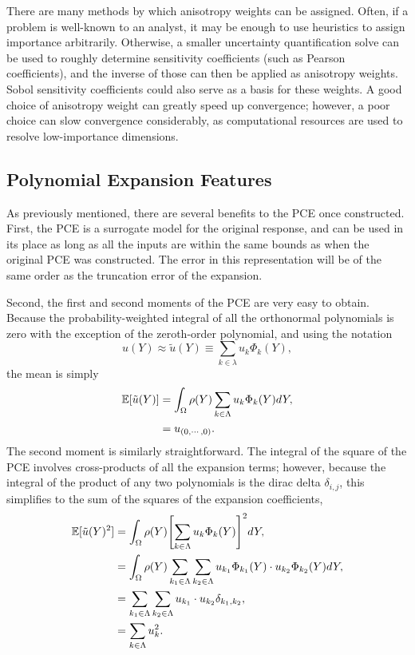 There are many methods by which anisotropy weights can be assigned.  Often, if a problem is well-known to an 
analyst, it may be enough to use heuristics to assign importance arbitrarily.  Otherwise, a smaller
uncertainty quantification solve can be used to roughly determine sensitivity coefficients (such as Pearson
coefficients), and the inverse of those can then be applied as anisotropy weights.  Sobol sensitivity coefficients
 could also serve as a basis for these weights.
A good choice of anisotropy weight can greatly speed up convergence; however, a
poor choice can slow convergence considerably, as computational resources are used to resolve low-importance
dimensions.


\subsection{Polynomial Expansion Features}
As previously mentioned, there are several benefits to the PCE once constructed.  First, the PCE is a
surrogate model for the original response, and can be used in its place as long as all the inputs are within
the same bounds as when the original PCE was constructed.  The error in this representation will be of the
same order as the truncation error of the expansion.

Second, the first and second moments of the PCE are very easy to obtain.  Because the probability-weighted 
integral of all the orthonormal polynomials is zero with the exception of the zeroth-order polynomial, and
using the notation 
\begin{equation}
  u(Y) \approx \tilde u(Y) \equiv \sum_{k\in\lambda} u_k\Phi_k(Y),
\end{equation}
the mean is simply
\begin{align}
  \mathbb{E}[ \tilde u(Y)]  &= \int_\Omega \rho(Y) \sum_{k\in\Lambda} u_k\Phi_k(Y) dY, \nonumber\\
                      &= u_{(0,\cdots,0)}.
\end{align}
The second moment is similarly straightforward.  The integral of the square of the PCE involves cross-products of
all the expansion terms; however, because the integral of the product of any two polynomials is the dirac
delta $\delta_{i,j}$, this simplifies to the sum of the squares of the expansion coefficients,
\begin{align}
  \expv{\tilde u(Y)^2} &=\int_\Omega \rho(Y) \qty[\sum_{k\in\Lambda} u_k\Phi_k(Y)]^2 dY,
                 \nonumber\\ \vspace{5pt}
  &= \int_\Omega \rho(Y) \sum_{k_1\in\Lambda} \sum_{k_2\in\Lambda} u_{k_1}\Phi_{k_1}(Y) \cdot 
                           u_{k_2}\Phi_{k_2}(Y) dY, \nonumber \\ \vspace{5pt}
  &= \sum_{k_1\in\Lambda} \sum_{k_2\in\Lambda} u_{k_1} \cdot u_{k_2}\delta_{k_1,k_2},\nonumber \\ \vspace{5pt}
  &= \sum_{k\in\Lambda} u_k^2.
\end{align}


